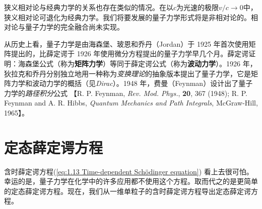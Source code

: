 	狭义相对论与经典力学的关系也存在类似的情况。在以$c$为光速的极限$v/c \to 0$中，狭义相对论可退化为经典力学。我们将要发展的量子力学形式将是非相对论的。相对论与量子力学的完全融合尚未实现。

	从历史上看，量子力学是由海森堡、玻恩和乔丹（Jordan）于 1925 年首次使用矩阵提出的，比薛定谔于 1926 年使用微分方程提出的量子力学早几个月。薛定谔证明：海森堡公式（称为\textbf{矩阵力学}）等同于薛定谔公式（称为\textbf{波动力学}）。1926 年，狄拉克和乔丹分别独立地用一种称为\textit{变换理论}的抽象版本提出了量子力学，它是矩阵力学和波动力学的概括（见\textit{Dirac}）。1948 年，费曼（Feynman）设计出了量子力学的\textit{路径积分}公式 【R. P. Feynman, \textit{Rev. Mod. Phys.}, \textbf{20}, 367 (1948); R. P. Feynman and A. R. Hibbs, \textit{Quantum Mechanics and Path Integrals}, McGraw-Hill, 1965】。

\section{定态薛定谔方程}
\label{sec:1.5 The Time-Independent Schrödinger Equation}

	含时薛定谔方程(\ref{eq:1.13 Time-dependent Schödinger equation}) 看上去很可怕。幸运的是，量子力学在化学中的许多应用都不使用这个方程。取而代之的是更简单的定态薛定谔方程。现在，我们从一维单粒子的含时薛定谔方程导出定态薛定谔方程。

